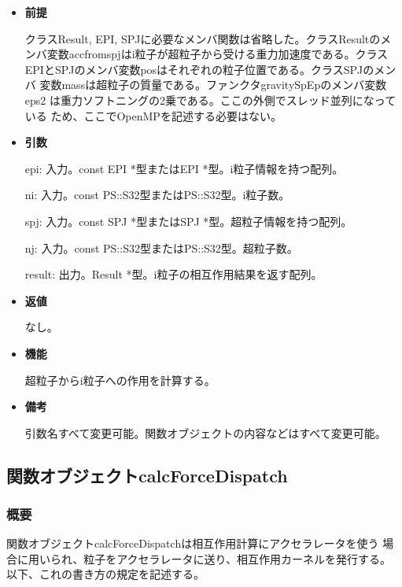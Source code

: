 \begin{itemize}

\item {\bf 前提}

  クラスResult, EPI, SPJに必要なメンバ関数は省略した。クラスResultのメ
  ンバ変数accfromspjはi粒子が超粒子から受ける重力加速度である。クラス
  EPIとSPJのメンバ変数posはそれぞれの粒子位置である。クラスSPJのメンバ
  変数massは超粒子の質量である。ファンクタgravitySpEpのメンバ変数eps2
  は重力ソフトニングの2乗である。ここの外側でスレッド並列になっている
  ため、ここでOpenMPを記述する必要はない。

\item {\bf 引数}

  epi: 入力。const EPI *型またはEPI *型。i粒子情報を持つ配列。

  ni: 入力。const PS::S32型またはPS::S32型。i粒子数。

  spj: 入力。const SPJ *型またはSPJ *型。超粒子情報を持つ配列。
  
  nj: 入力。const PS::S32型またはPS::S32型。超粒子数。

  result: 出力。Result *型。i粒子の相互作用結果を返す配列。

\item {\bf 返値}

  なし。
  
\item {\bf 機能}

  超粒子からi粒子への作用を計算する。
  
\item {\bf 備考}

  引数名すべて変更可能。関数オブジェクトの内容などはすべて変更可能。
  
\end{itemize}



\subsection{関数オブジェクトcalcForceDispatch}
\label{sec:example_userdefined_calcForceDispatch}

\subsubsection{概要}

関数オブジェクトcalcForceDispatchは相互作用計算にアクセラレータを使う
場合に用いられ、粒子をアクセラレータに送り、相互作用カーネルを発行する。
以下、これの書き方の規定を記述する。

